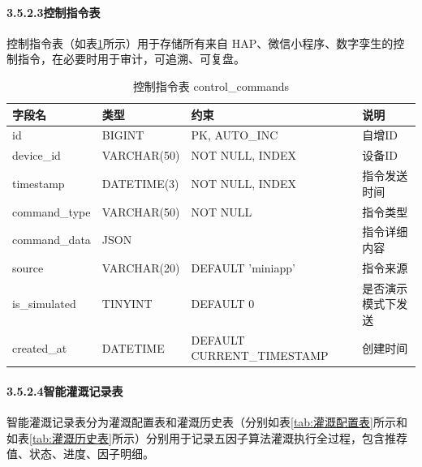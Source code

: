 \documentclass{article}
\begin{document}
\paragraph{3.5.2.3控制指令表}

控制指令表（如表\ref{tab:控制指令表}所示）用于存储所有来自 HAP、微信小程序、数字孪生的控制指令，在必要时用于审计，可追溯、可复盘。

\begin{table}[htbp]
  \centering
  \caption{控制指令表 control\_commands}
  \label{tab:控制指令表}
  \begin{tabular}{|l|l|l|l|}
    \hline
    字段名       & 类型        & 约束                        & 说明               \\
    \hline
    id           & BIGINT      & PK, AUTO\_INC               & 自增ID             \\
    device\_id    & VARCHAR(50) & NOT NULL, INDEX             & 设备ID             \\
    timestamp    & DATETIME(3) & NOT NULL, INDEX             & 指令发送时间       \\
    command\_type & VARCHAR(50) & NOT NULL                    & 指令类型           \\
    command\_data & JSON        &                             & 指令详细内容       \\
    source       & VARCHAR(20) & DEFAULT 'miniapp'           & 指令来源           \\
    is\_simulated & TINYINT     & DEFAULT 0                   & 是否演示模式下发送 \\
    created\_at   & DATETIME    & DEFAULT CURRENT\_TIMESTAMP  & 创建时间           \\
    \hline
  \end{tabular}
\end{table}

\paragraph{3.5.2.4智能灌溉记录表}

智能灌溉记录表分为灌溉配置表和灌溉历史表（分别如表\ref{tab:灌溉配置表}所示和如表\ref{tab:灌溉历史表}所示）分别用于记录五因子算法灌溉执行全过程，包含推荐值、状态、进度、因子明细。
\end{document}

